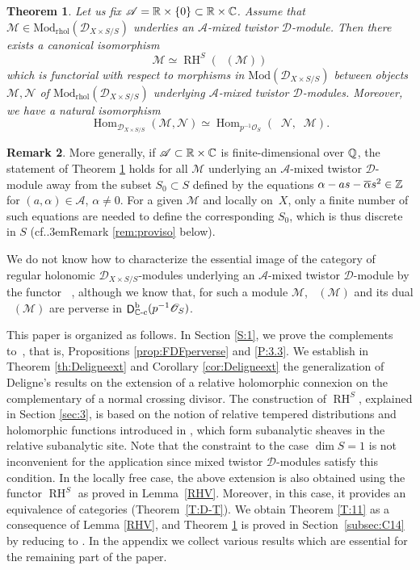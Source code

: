 \documentclass[english]{smfart}
\numberwithin{subsection}{section}
\def\sha{\mathcal{A}}\let\cA\sha
\def\shd{\mathcal{D}}\let\cD\shd
\def\shm{\mathcal{M}}
\def\shn{\mathcal{N}}\let\shn\shn
\def\sho{\mathcal{O}}\let\cO\sho
\newcommand{\C}{\mathbb{C}}\let\CC\C
\DeclareMathOperator{\RH}{RH}
\newcommand{\rb}{\mathrm{b}}
\newcommand{\rhol}{\mathrm{rhol}}
\newcommand{\Mod}{\mathrm{Mod}}
\newcommand{\cc}{{\C\textup{-c}}}
\newcommand{\XS}{X\times S}
\newcommand{\DXS}{\shd_{\XS/S}}
\DeclareMathOperator{\rD}{\mathsf{D}}
\DeclareMathOperator{\pDR}{{}^\mathrm{p}DR}
\DeclareMathOperator{\Hom}{Hom}
\DeclareMathOperator{\pSol}{{}^\mathrm{p}Sol}
\let\ov\overline
\def\cf{cf.\kern.3em}
\newcommand{\pOS}{p^{-1}\sho_S}
\numberwithin{equation}{section}
\theoremstyle{plain}
\newtheorem{theoremintro}{Theorem}
\theoremstyle{definition}
\newtheorem{remintro}[theoremintro]{Remark}
\begin{document}
\begin{theoremintro}\label{C:14}
Let us fix $\sha=\RR\times\{0\}\subset\RR\times\CC$. Assume that $\shm\in\Mod_\rhol(\DXS)$ underlies an $\sha$-mixed twistor $\cD$-module. Then there exists a canonical isomorphism
\[\tag{$*$}
\shm\simeq \RH^S(\pSol(\shm))
\]
which is functorial with respect to morphisms in $\Mod(\DXS)$ between objects $\shm,\shn$ of $\Mod_\rhol(\DXS)$ underlying $\sha$-mixed twistor $\cD$-modules. Moreover, we have a natural isomorphism
\[\tag{$**$}
\Hom_{\DXS}(\shm,\shn)\simeq\Hom_{\pOS}(\pSol\shn,\pSol\shm).
\]
\end{theoremintro}

\begin{remintro}\label{rem:intro}
More generally, if $\sha\subset\RR\times\CC$ is finite-dimensional over $\mathbb{Q}$, the statement of Theorem \ref{C:14} holds for all $\shm$ underlying an $\sha$-mixed twistor $\cD$-module away from the subset $S_0\subset S$ defined by the equations $\alpha-as-\ov\alpha s^2\in\ZZ$ for $(a,\alpha)\in\sha$, $\alpha\neq0$. For a given $\shm$ and locally on~$X$, only a finite number of such equations are needed to define the corresponding $S_0$, which is thus discrete in $S$ (\cf Remark \ref{rem:proviso} below).
\end{remintro}

We do not know how to characterize the essential image of the category of regular holonomic $\cD_{\XS/S}$-modules underlying an $\sha$-mixed twistor $\shd$-module by the functor $\pSol$, although we know that, for such a module $\shm$, $\pSol(\shm)$ and its dual $\pDR(\shm)$ are perverse in $\rD^\rb_\cc(\pOS)$.

This paper is organized as follows. In Section \ref{S:1}, we prove the complements to~\cite{MF-S12}, that is, Propositions \ref{prop:FDFperverse} and \ref{P:3.3}. We establish in Theorem \ref{th:Deligneext} and Corollary \ref{cor:Deligneext} the generalization of Deligne's results on the extension of a relative holomorphic connexion on the complementary of a normal crossing divisor. The construction of $\RH^S$, explained in Section \ref{sec:3}, is based on the notion of relative tempered distributions and holomorphic functions introduced in \cite{MF-P14}, which form subanalytic sheaves in the relative subanalytic site. Note that the constraint to the case $\dim S=1$ is not inconvenient for the application since mixed twistor $\shd$-modules satisfy this condition. In the locally free case, the above extension is also obtained using the functor $\RH^S$ as proved in Lemma~\ref{RHV}. Moreover, in this case, it provides an equivalence of categories (Theorem~\ref{T:D-T}). We obtain Theorem \ref{T:11} as a consequence of Lemma \ref{RHV}, and Theorem \ref{C:14} is proved in Section~\ref{subsec:C14} by reducing to \cite[Cor.\,8.6]{Kashiwara84}. In the appendix we collect various results which are essential for the remaining part of the paper.
\end{document}
